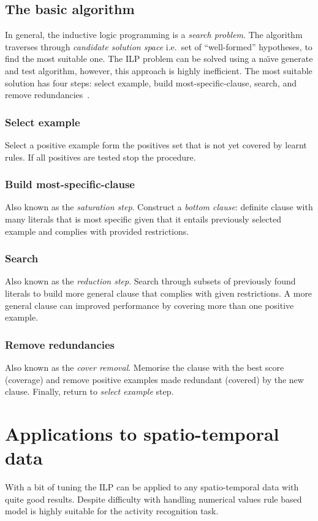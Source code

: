 \documentclass[10pt, a4paper, pdflatex, leqno, twoside, openright]{report}
\begin{document}
    \subsection{The basic algorithm}
In general, the inductive logic programming is a \emph{search problem}. The algorithm traverses through \emph{candidate solution space} i.e.\ set of ``well-formed'' hypotheses, to find the most suitable one. The ILP problem can be solved using a na\"{\i}ve generate and test algorithm, however, this approach is highly inefficient. The most suitable solution has four steps: select example, build most-specific-clause, search, and remove redundancies~\citep{muggleton1994inductive}.

      \subsubsection{Select example}
Select a positive example form the positives set that is not yet covered by learnt rules. If all positives are tested stop the procedure.

      \subsubsection{Build most-specific-clause}
Also known as the \emph{saturation step}. Construct a \emph{bottom clause}: definite clause with many literals that is most specific given that it entails previously selected example and complies with provided restrictions.

      \subsubsection{Search}
Also known as the \emph{reduction step}. Search through subsets of previously found literals to build more general clause that complies with given restrictions. A more general clause can improved performance by covering more than one positive example.

      \subsubsection{Remove redundancies}
Also known as the \emph{cover removal}. Memorise the clause with the best score (coverage) and remove positive examples made redundant (covered) by the new clause. Finally, return to \emph{select example} step.

  \section{Applications to spatio-temporal data}
With a bit of tuning the ILP can be applied to any spatio-temporal data with quite good results. Despite difficulty with handling numerical values rule based model is highly suitable for the activity recognition task.\\
\end{document}
